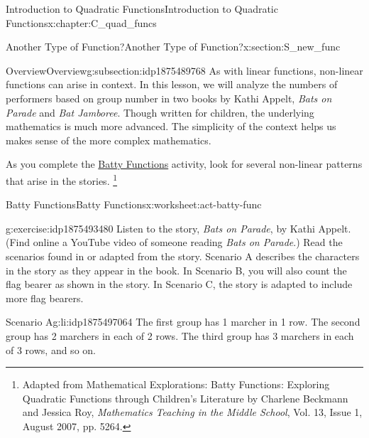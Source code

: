 \documentclass[oneside,10pt,]{book}
\newcommand{\pubtitle}[1]{\textsl{#1}}
\numberwithin{equation}{chapter}
\begin{document}
\begin{chapterptx}{Introduction to Quadratic Functions}{}{Introduction to Quadratic Functions}{}{}{x:chapter:C_quad_funcs}
%
\begin{sectionptx}{Another Type of Function?}{}{Another Type of Function?}{}{}{x:section:S_new_func}
%
%
\typeout{************************************************}
\typeout{************************************************}
%
\begin{subsectionptx}{Overview}{}{Overview}{}{}{g:subsection:idp1875489768}
As with linear functions, non-linear functions can arise in context. In this lesson, we will analyze the numbers of performers based on group number in two books by Kathi Appelt, \pubtitle{Bats on Parade} and \pubtitle{Bat Jamboree}. Though written for children, the underlying mathematics is much more advanced. The simplicity of the context helps us makes sense of the more complex mathematics.%
\par
As you complete the \hyperref[x:worksheet:act-batty-func]{Batty Functions} activity, look for several non-linear patterns that arise in the stories. \footnote{Adapted from Mathematical Explorations: Batty Functions: Exploring Quadratic Functions through Children's Literature by Charlene Beckmann and Jessica Roy, \pubtitle{Mathematics Teaching in the Middle School}, Vol. 13, Issue 1, August 2007, pp. 52\textemdash{}64.\label{g:fn:idp1875485544}}%
\end{subsectionptx}
%
%
\typeout{************************************************}
\typeout{************************************************}
%
\begin{worksheet-subsection}{Batty Functions}{}{Batty Functions}{}{}{x:worksheet:act-batty-func}
\begin{divisionexercise}{1}{}{}{g:exercise:idp1875493480}%
Listen to the story, \pubtitle{Bats on Parade}, by Kathi Appelt. (Find online a YouTube video of someone reading \pubtitle{Bats on Parade}.) Read the scenarios found in or adapted from the story. Scenario A describes the characters in the story as they appear in the book. In Scenario B, you will also count the flag bearer as shown in the story. In Scenario C, the story is adapted to include more flag bearers.%
\begin{descriptionlist}
\begin{dlimedium}{Scenario A}{g:li:idp1875497064}%
The first group has 1 marcher in 1 row. The second group has 2 marchers in each of 2 rows. The third group has 3 marchers in each of 3 rows, and so on.%
\end{dlimedium}%

\end{descriptionlist}
\end{divisionexercise}
\end{worksheet-subsection}
\end{sectionptx}
\end{chapterptx}
\end{document}
